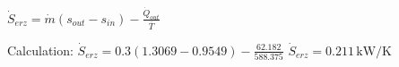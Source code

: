 \( \dot{S}_{erz} = \dot{m} (s_{out} - s_{in}) - \frac{\dot{Q}_{out}}{\overline{T}} \)  

Calculation:  
\( \dot{S}_{erz} = 0.3 (1.3069 - 0.9549) - \frac{62.182}{588.375} \)  
\( \dot{S}_{erz} = 0.211 \, \text{kW/K} \)